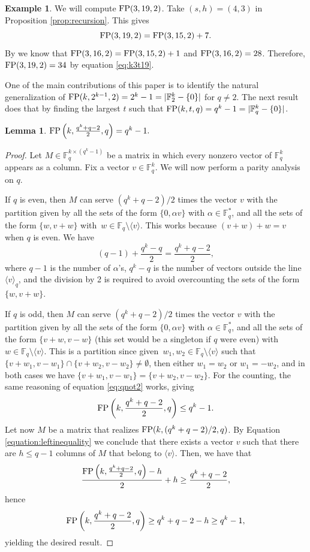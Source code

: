 \documentclass[11pt,a4paper]{article}
\theoremstyle{definition}
\newtheorem{lemma}[theorem]{Lemma}
\newtheorem{example}[theorem]{Example}
\newcommand{\F}{\mathbb F}
\newcommand{\fp}{\textnormal{FP}}
\begin{document}
\begin{example}
We will compute $\fp(3,19,2)$. Take $(s,h)=(4,3)$ in Proposition \ref{prop:recursion}. This gives
\begin{equation}
\label{eq:k3t19}
\fp(3,19,2) = \fp(3,15,2)+7.
\end{equation}
By \cite[Theorem 5]{zhang2020bounds} we know that $\fp(3,16,2)=\fp(3,15,2)+1$ and $\fp(3,16,2)=28$. Therefore, $\fp(3,19,2)=34$ by equation \eqref{eq:k3t19}.
\end{example}

One of the main contributions of this paper is to identify the natural generalization of $\fp(k,2^{k-1},2)=2^k-1=|\F_2^k-\{0\}|$ for $q\neq 2.$ The next result does that by finding the largest $t$ such that $\fp(k,t,q)=q^k-1=|\F_q^k-\{0\}|$.

\begin{lemma}
\label{lemma:constrq}
    $\fp\left(k,\frac{q^k+q-2}{2},q\right)=q^k-1.$
\end{lemma}
\begin{proof}
Let $M\in \F_q^{k\times (q^k-1)}$ be a matrix in which every nonzero vector of $\F_q^k$ appears as a column. Fix a vector $v\in\F_q^k$. We will now perform a parity analysis on $q$. 

If $q$ is even, then $M$ can serve $(q^k+q-2)/2$ times the vector $v$ with the partition given by all the sets of the form $\{0,\alpha v\}$ with $\alpha\in\F_q^*$, and all the sets of the form $\{w,v+w\}$ with~$w\in\F_q\setminus\langle v\rangle$. This works because $(v+w)+w=v$ when $q$ is even. We have 
\begin{equation}
\label{eq:qnot2}
(q-1)+\frac{q^k-q}{2} = \frac{q^k+q-2}{2},
\end{equation}
where $q-1$ is the number of $\alpha$'s, $q^k-q$ is the number of vectors outside the line $\langle v \rangle_q$, and the division by 2 is required to avoid overcounting the sets of the form $\{w,v+w\}$.

If $q$ is odd, then $M$ can serve $(q^k+q-2)/2$ times the vector $v$ with the partition given by all the sets of the form $\{0,\alpha v\}$ with $\alpha\in\F_q^*$, and all the sets of the form $\{v+w,v-w\}$ (this set would be a singleton if $q$ were even) with $w\in\F_q\setminus\langle v\rangle$. This is a partition since given~$w_1,w_2\in\F_q\setminus\langle v\rangle$ such that $\{v+w_1,v-w_1\}\cap\{v+w_2,v-w_2\}\neq\emptyset$, then either $w_1=w_2$ or $w_1=-w_2$, and in both cases we have $\{v+w_1,v-w_1\}=\{v+w_2,v-w_2\}$. For the counting, the same reasoning of equation \eqref{eq:qnot2} works, giving    \begin{equation}\label{equation:leftinequality}
        \fp\left(k,\frac{q^k+q-2}{2},q\right)\leq q^k-1.
    \end{equation}
    Let now $M$ be a matrix that realizes $\fp(k,(q^k+q-2)/2,q)$. By Equation \eqref{equation:leftinequality} we conclude that there exists a vector $v$ such that there are $h\leq q-1$ columns of $M$ that belong to $\langle v\rangle$. Then, we have that$$\frac{\fp\left(k,\frac{q^k+q-2}{2},q\right)-h}{2}+h\geq \frac{q^k+q-2}{2},$$ hence 
$$\fp\left(k,\frac{q^k+q-2}{2},q\right) \ge q^k+q-2-h \ge q^k-1,$$ yielding the desired result.  
\end{proof}
\end{document}
